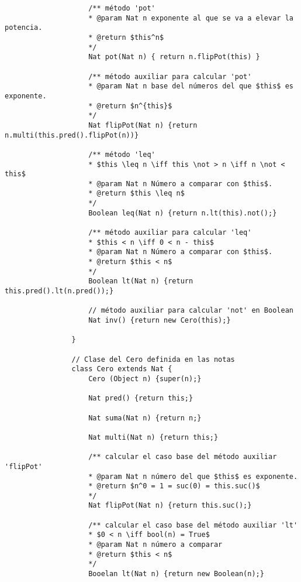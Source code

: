 \documentclass{article}
\begin{document}
\begin{enumerate}
\begin{enumerate}
\begin{verbatim}
                    /** método 'pot'
                    * @param Nat n exponente al que se va a elevar la potencia.
                    * @return $this^n$
                    */
                    Nat pot(Nat n) { return n.flipPot(this) }

                    /** método auxiliar para calcular 'pot'
                    * @param Nat n base del números del que $this$ es exponente.
                    * @return $n^{this}$
                    */
                    Nat flipPot(Nat n) {return n.multi(this.pred().flipPot(n))}

                    /** método 'leq'
                    * $this \leq n \iff this \not > n \iff n \not < this$
                    * @param Nat n Número a comparar con $this$.
                    * @return $this \leq n$
                    */
                    Boolean leq(Nat n) {return n.lt(this).not();}

                    /** método auxiliar para calcular 'leq'
                    * $this < n \iff 0 < n - this$
                    * @param Nat n Número a comparar con $this$.
                    * @return $this < n$
                    */
                    Boolean lt(Nat n) {return this.pred().lt(n.pred());}

                    // método auxiliar para calcular 'not' en Boolean
                    Nat inv() {return new Cero(this);}

                }

                // Clase del Cero definida en las notas
                class Cero extends Nat {
                    Cero (Object n) {super(n);}

                    Nat pred() {return this;}

                    Nat suma(Nat n) {return n;}

                    Nat multi(Nat n) {return this;}

                    /** calcular el caso base del método auxiliar 'flipPot'
                    * @param Nat n número del que $this$ es exponente.
                    * @return $n^0 = 1 = suc(0) = this.suc()$
                    */
                    Nat flipPot(Nat n) {return this.suc();}

                    /** calcular el caso base del método auxiliar 'lt'
                    * $0 < n \iff bool(n) = True$
                    * @param Nat n número a comparar
                    * @return $this < n$
                    */
                    Booelan lt(Nat n) {return new Boolean(n);}


\end{verbatim}
\end{enumerate}
\end{enumerate}
\end{document}
